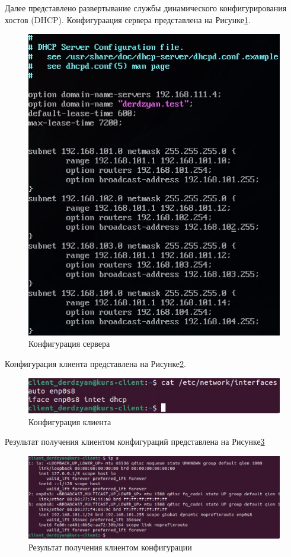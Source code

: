 Далее представлено развертывание службы динамического конфигурирования хостов (DHCP). Конфигураация сервера представлена на Рисунке\;\ref{fig:DHCP_config_server}.

\begin{figure}[H]
\centering
\includegraphics[scale=0.6]{../misc/DHCP_config_server.jpg}
\caption{Конфигурация сервера\label{fig:DHCP_config_server}}
\end{figure}

Конфигурация клиента представлена на Рисунке\;\ref{fig:DHCP_config_client}.

\begin{figure}[H]
\centering
\includegraphics[scale=0.6]{../misc/DHCP_config_client.jpg}
\caption{Конфигурация клиента\label{fig:DHCP_config_client}}
\end{figure}


Результат получения клиентом конфигураций представлена на Рисунке\;\ref{fig:DHCP_res}

\begin{figure}[H]
\centering
\includegraphics[scale=0.5]{../misc/DHCP_res.jpg}
\caption{Результат получения клиентом конфигурации\label{fig:DHCP_res}}
\end{figure}


